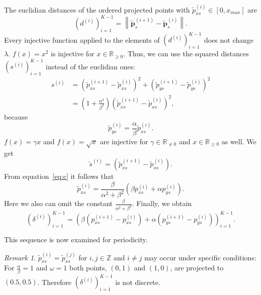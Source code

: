 \documentclass[11pt]{article}
\theoremstyle{remark}
\newtheorem{remark}{Remark}
\begin{document}
The euclidian distances of the ordered projected points with $\tilde{p}_{x s}^{(i)} \in [0, x_{max}]$ are
%
\begin{equation}
\left( d^{(i)} \right)_{i=1}^{K-1} = \left\lVert \mathbf{\tilde{p}}^{(i+1)}_s - \mathbf{\tilde{p}}^{(i)}_s \right\rVert.
\end{equation}
%
Every injective function applied to the elements of $\left(d^{(i)}\right)_{i=1}^{K-1}$ does not change $\lambda$.
%
$f(x) = x^2$ is injective for $x \in \mathbb{R}_{\geq 0}$. Thus, we can use the squared distances $\left(s^{(i)}\right)_{i=1}^{K-1}$ instead of the euclidian ones:
%
\begin{align}
s^{(i)} &= \left(\tilde{p}_{x s}^{(i+1)} - \tilde{p}_{x s}^{(i)}\right)^2 + \left(\tilde{p}_{y s}^{(i+1)} - \tilde{p}_{y s}^{(i)}\right)^2 \\
                                 &= \left(1 + \frac{\alpha^2}{\beta^2} \right) \left(\tilde{p}_{x s}^{(i+1)} - \tilde{p}_{x s}^{(i)}\right)^2,
\end{align}
%
because
%
\begin{equation}
\tilde{p}_{y s}^{(i)} = \frac{\alpha}{\beta} \tilde{p}_{x s}^{(i)}.
\end{equation}
%
$f(x) = \gamma x$ and $f(x) = \sqrt{x}$ are injective for $\gamma \in \mathbb{R}_{\ne 0}$ and $x \in \mathbb{R}_{\geq 0}$ as well. We get
%
\begin{equation}
\tilde{s}^{(i)} = \left(\tilde{p}_{x s}^{(i+1)} - \tilde{p}_{x s}^{(i)}\right).
\end{equation}
%
From equation~\eqref{eq:c} it follows that
%
\begin{equation}
\tilde{p}_{x s}^{(i)} = \frac{\beta}{\alpha^2 + \beta^2} \left( \beta p_{x s}^{(i)} + \alpha p_{y s}^{(i)} \right).
\end{equation}
%
Here we also can omit the constant $\frac{\beta}{\alpha^2 + \beta^2}$. Finally, we obtain
%
\begin{equation}
\left(\delta^{(i)}\right)_{i=1}^{K-1} =
\left( 
	\beta \left( p_{x s}^{(i+1)} - p_{x s}^{(i)} \right)
	+ \alpha \left( p_{y s}^{(i+1)} - p_{y s}^{(i)} \right) 
\right)_{i=1}^{K-1}.
\label{delta}
\end{equation}

This sequence is now examined for periodicity.

\begin{remark}
$\tilde{p}_{x s}^{(i)} = \tilde{p}_{x s}^{(j)}$ for $i, j \in \mathbb{Z}$ and $i \ne j$ may occur under specific conditions: For $\frac{\alpha}{\beta} = 1$ and $\omega = 1$ both points, $(0, 1)$ and $(1, 0)$, are projected to $(0.5, 0.5)$. Therefore $\left(\delta^{(i)}\right)_{i=1}^{K-1}$ is not discrete.
\end{remark}
\end{document}
